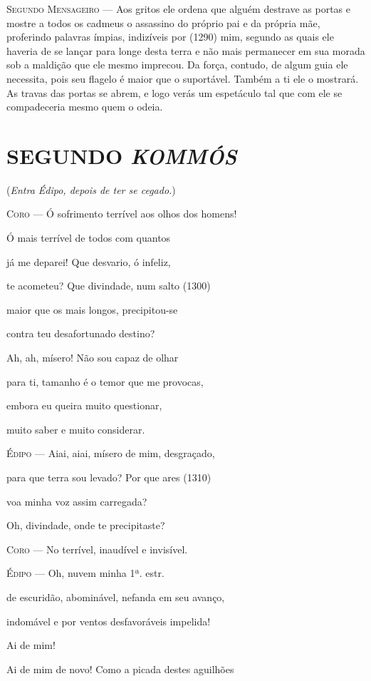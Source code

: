 \textsc{Segundo Mensageiro} --- Aos gritos ele ordena que alguém destrave as portas e mostre a todos os
cadmeus o assassino do próprio pai e da própria mãe, proferindo palavras
ímpias, indizíveis por (1290) mim, segundo as quais ele haveria de se
lançar para longe desta terra e não mais permanecer em sua morada sob a
maldição que ele mesmo imprecou. Da força, contudo, de algum guia ele
necessita, pois seu flagelo é maior que o suportável. Também a ti ele o
mostrará. As travas das portas se abrem, e logo verás um espetáculo tal
que com ele se compadeceria mesmo quem o odeia.

\section{SEGUNDO \emph{KOMMÓS}}

(\emph{Entra Édipo, depois de ter se cegado.})

\textsc{Coro} --- Ó sofrimento terrível aos olhos dos homens!

Ó mais terrível de todos com quantos

já me deparei! Que desvario, ó infeliz,

te acometeu? Que divindade, num salto (1300)

maior que os mais longos, precipitou-se

contra teu desafortunado destino?

Ah, ah, mísero! Não sou capaz de olhar

para ti, tamanho é o temor que me provocas,

embora eu queira muito questionar,

muito saber e muito considerar.

\textsc{Édipo} --- Aiai, aiai, mísero de mim, desgraçado,

para que terra sou levado? Por que ares (1310)

voa minha voz assim carregada?

Oh, divindade, onde te precipitaste?

\textsc{Coro} --- No terrível, inaudível e invisível.

\textsc{Édipo} --- Oh, nuvem minha 1ª. estr.

de escuridão, abominável, nefanda em seu avanço,

indomável e por ventos desfavoráveis impelida!

Ai de mim!

Ai de mim de novo! Como a picada destes aguilhões

